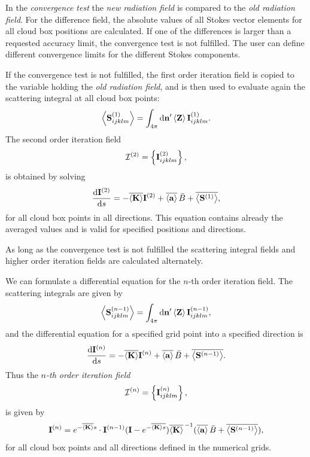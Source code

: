In the \emph{convergence test} the \emph{new radiation field} is
compared to the \emph{old radiation field}. For the difference field,
the absolute values of all Stokes vector elements for all cloud box
positions are calculated. If one of the differences is larger than a
requested accuracy limit, the convergence test is not fulfilled. The
user can define different convergence limits for the different Stokes
components.

If the convergence test is not fulfilled, the first order iteration
field is copied to the variable holding the \emph{old radiation field}, 
and is then used to evaluate again the scattering integral at all
cloud box points:
\begin{equation}
  \left\langle {\bf S}^{(1)}_{ijklm} \right\rangle = \int_{4\pi} \mathrm{d} {\bf n}'
  \left\langle {\bf Z} \right\rangle {\bf I}^{(1)}_{ijklm}.
\end{equation}
The second order iteration field
\begin{equation}
  {\mathcal I}^{(2)} = \left\{{\bf I}^{(2)}_{ijklm}\right\},  
\end{equation}
is obtained by solving
\begin{equation}
  \frac{\mathrm{d} {\bf I}^{(2)}}{\mathrm{d} s} =
  -\overline{\left\langle {\bf K} \right\rangle}  {\bf I}^{(2)} + \overline{\left\langle {\bf a} \right\rangle}\,  \bar{B}
  +\overline{\left\langle {\bf S}^{(1)} \right\rangle},
\end{equation}
for all cloud box points in all directions.  This equation contains
already the averaged values and is valid for specified positions and
directions.

As long as the convergence test is not fulfilled the scattering integral fields and higher order iteration
fields are calculated alternately. 

We can formulate a differential equation for the $n$-th order
iteration field. The scattering integrals are given by
\begin{equation}
 \left\langle {\bf S}^{(n-1)}_{ijklm} \right\rangle = \int_{4\pi} \mathrm{d} {\bf n}'
  \left\langle {\bf Z} \right\rangle {\bf I}^{(n-1)}_{ijklm},
\end{equation}
and the differential equation for a specified grid point into a
specified direction is
\begin{equation}
  \frac{\mathrm{d} {\bf I}^{(n)}}{\mathrm{d} s} =
  -\overline{\left\langle {\bf K} \right\rangle}  {\bf I}^{(n)} + \overline{\left\langle {\bf a} \right\rangle} \,\bar{B}
  +\overline{\left\langle {\bf S}^{(n-1)} \right\rangle}.
\end{equation}
Thus the \emph{$n$-th order iteration field }
\begin{equation}
  {\mathcal I}^{(n)} = \left\{ {\bf I}^{(n)}_{ijklm} \right\},  
\end{equation}
is given by
\begin{equation}
  {\bf I}^{(n)} =  e^{-\overline{\left\langle {\bf K} \right\rangle}
    s}\cdot{\bf I}^{(n-1)}  (\mathbf{I} - e^{-\overline {\left\langle {\bf K} \right\rangle
    s}} ) \overline{\left\langle {\bf K} \right\rangle} ^{\,-1} ( \overline{\left\langle {\bf a} \right\rangle}\,\bar{B} + \overline{\left\langle {\bf S}^{(n-1)} \right\rangle} ),
\end{equation}
for all cloud box points and all directions defined in the numerical
grids.

